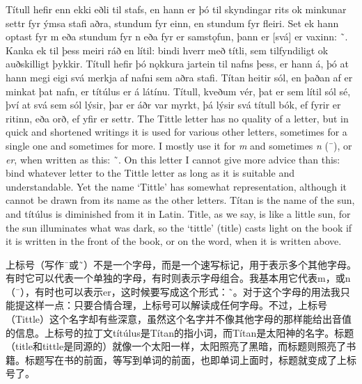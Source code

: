 \begin{paracol}{2}
  Títull hefir enn ekki eðli til stafs, en hann er þó til skyndingar rits ok minkunar settr fyr ýmsa stafi aðra, stundum fyr einn, en stundum fyr fleiri. Set ek hann optast fyr m eða stundum fyr n eða fyr er samstǫfun, þann er [svá] er vaxinn: ˜. Kanka ek til þess meiri ráð en lítil: bindi hverr með títli, sem tilfyndiligt ok auðskilligt þykkir. Títull hefir þó nǫkkura jartein til nafns þess, er hann á, þó at hann megi eigi svá merkja af nafni sem aðra stafi. Títan heitir sól, en þaðan af er minkat þat nafn, er títúlus er á látínu. Títull, kveðum vér, þat er sem lítil sól sé, því at svá sem sól lýsir, þar er áðr var myrkt, þá lýsir svá títull bók, ef fyrir er ritinn, eða orð, ef yfir er settr.
  \switchcolumn
  The Tittle letter has no quality of a letter, but in quick and shortened writings it is used for various other letters, sometimes for a single one and sometimes for more. I mostly use it for \textit{m} and sometimes \textit{n} (¯), or \textit{er}, when written as this: ˜. On this letter I cannot give more advice than this: bind whatever letter to the Tittle letter as long as it is suitable and understandable. Yet the name `Tittle' has somewhat representation, although it cannot be drawn from its name as the other letters. Títan is the name of the sun, and títúlus is diminished from it in Latin. Title, as we say, is like a little sun, for the sun illuminates what was dark, so the `tittle' (title) casts light on the book if it is written in the front of the book, or on the word, when it is written above.
\end{paracol}
\begin{translation*}{}
  上标号（写作¯或˜）不是一个字母，而是一个速写标记，用于表示多个其他字母。有时它可以代表一个单独的字母，有时则表示字母组合。我基本用它代表m，或n（¯），有时也可以表示er，这时候要写成这个形式：˜。对于这个字母的用法我只能提这样一点：只要合情合理，上标号可以解读成任何字母。不过，上标号（Tittle）这个名字却有些深意，虽然这个名字并不像其他字母的那样能给出音值的信息。上标号的拉丁文títúlus是Títan的指小词，而Títan是太阳神的名字。标题（title和tittle是同源的）就像一个太阳一样，太阳照亮了黑暗，而标题则照亮了书籍。标题写在书的前面，等写到单词的前面，也即单词上面时，标题就变成了上标号了。
\end{translation*}

